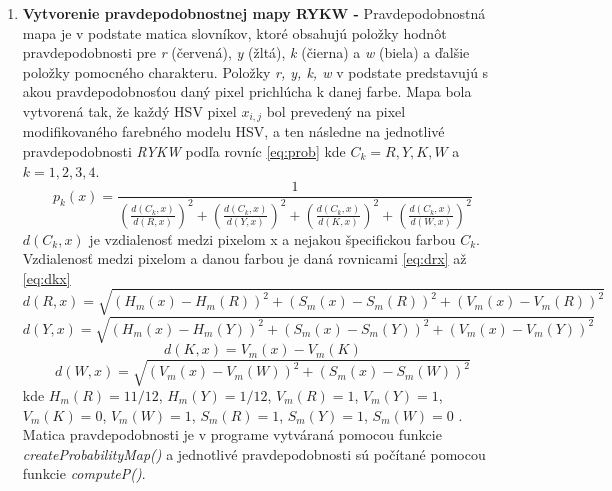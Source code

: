 \begin{enumerate}
    \item \textbf{Vytvorenie pravdepodobnostnej mapy RYKW -} Pravdepodobnostná mapa je v podstate matica slovníkov, ktoré obsahujú položky hodnôt pravdepodobnosti pre \textit{r} (červená), \textit{y} (žltá), \textit{k} (čierna) a \textit{w} (biela) a ďalšie položky pomocného charakteru. Položky \textit{r, y, k, w} v podstate predstavujú s akou pravdepodobnosťou daný pixel prichlúcha k danej farbe. Mapa bola vytvorená tak, že každý HSV pixel $x_{i,j}$ bol prevedený na pixel modifikovaného farebného modelu HSV, a ten následne na jednotlivé pravdepodobnosti \textit{RYKW} podľa rovníc \ref{eq:prob} kde $C_k = {R, Y, K, W}$ a $k = 1, 2, 3, 4$.
    \begin{equation}
    \label{eq:prob}
    p_k(x) = \frac{1}{{(\frac{d(C_k, x)}{d(R, x)})}^2 + {(\frac{d(C_k, x)}{d(Y, x)})}^2 + {(\frac{d(C_k, x)}{d(K, x)})}^2 + {(\frac{d(C_k, x)}{d(W, x)})}^2}
    \end{equation}
    $d(C_k, x)$ je vzdialenosť medzi pixelom x a nejakou špecifickou farbou $C_k$. Vzdialenosť medzi pixelom a danou farbou je daná rovnicami \ref{eq:drx} až \ref{eq:dkx}
    \begin{equation}
    \label{eq:drx}
    d(R, x) = \sqrt{{(H_{m}(x) - H_{m}(R))}^2 + {(S_{m}(x) - S_{m}(R))}^2 + {(V_{m}(x) - V_{m}(R))}^2}
    \end{equation}
    \begin{equation}
    \label{eq:dyx}
    d(Y, x) = \sqrt{{(H_{m}(x) - H_{m}(Y))}^2 + {(S_{m}(x) - S_{m}(Y))}^2 + {(V_{m}(x) - V_{m}(Y))}^2}
    \end{equation}
    \begin{equation}
    \label{eq:dkx}
    d(K, x) = V_{m}(x) - V_{m}(K)
    \end{equation}
    \begin{equation}
    \label{eq:dkx}
    d(W, x) = \sqrt{{(V_{m}(x) - V_{m}(W))}^2 + {(S_{m}(x) - S_{m}(W))}^2}
    \end{equation}
    kde $H_{m}(R) = 11/12$, $H_{m}(Y) = 1/12$, $V_{m}(R) = 1$, $V_{m}(Y) = 1$, $V_{m}(K) = 0$, $V_{m}(W) = 1$, $S_{m}(R) = 1$, $S_{m}(Y) = 1$, $S_{m}(W) = 0$ \cite{AHMADFAUZI201574}. Matica pravdepodobnosti je v programe vytváraná pomocou funkcie \textit{createProbabilityMap()} a jednotlivé pravdepodobnosti sú počítané pomocou funkcie \textit{computeP()}. 

\end{enumerate}
